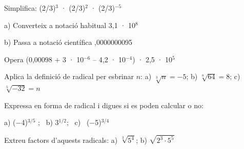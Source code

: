 \begin{autoaval}{30}
\begin{mylist}
\exer[2]  Simplifica: (2/3)${}^{3}$ · (2/3)${}^{2}$ ·  (2/3)${}^{-5}$

\exer[2]  a) Converteix a notació habitual 3,1 · 10${}^{8}$  

 b) Passa a notació científica ,0000000095 
\answers[cols=2]{[310000000, $9.5 \cdot 10^{-9}$]}

\exer[2]  Opera  (0,00098 + 3 · 10${}^{-6}$ -- 4,2 · 10${}^{-4}$) · 2,5 · 10${}^{5}$

\exer[2]  Aplica la definició de radical per esbrinar $n$: a) $\sqrt[3]{n}=-5 $; b) $\sqrt[n]{64}=8 $; c) $\sqrt[{5}]{-32}=n$
\answers{[$n=-125$, $n=2$, $n=-2$]}

\exer[2]  Expressa en forma de radical i digues si es poden calcular o no: 

a) ($-$4)${}^{3/5}$ ; \, b) 3${}^{1/2}$;   \, c) \,  ($-$5)${}^{3/4}$

\exer[2]  Extreu factors d'aquests radicals: a) $\sqrt[{3}]{5^{4} } $;  \quad b)  \quad $\sqrt{2^{3} \cdot 5^{5} } $ 


\end{mylist}
\end{autoaval}
